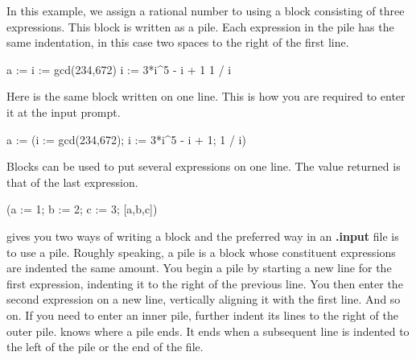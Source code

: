 {\begin{xtc}
\begin{xtccomment}
In this example, we assign a rational number to  using a block
consisting of three expressions.
This block is written as a pile.
Each expression in the pile has the same indentation, in this case two
spaces to the right of the first line.
\end{xtccomment}
\begin{spadsrc}
a :=
  i := gcd(234,672)
  i := 3*i^5 - i + 1
  1 / i
\end{spadsrc}
\begin{TeXOutput}
\begin{fricasmath}{1}
%
\end{fricasmath}
\end{TeXOutput}
\end{xtc}
\begin{xtc}
\begin{xtccomment}
Here is the same block written on one line.
This is how you are required to enter it at the input prompt.
\end{xtccomment}
\begin{spadsrc}
a := (i := gcd(234,672); i := 3*i^5 - i + 1; 1 / i)
\end{spadsrc}
\begin{TeXOutput}
\begin{fricasmath}{2}
%
\end{fricasmath}
\end{TeXOutput}
\end{xtc}
\begin{xtc}
\begin{xtccomment}
Blocks can be used to put several expressions on one line.
The value returned is that of the last expression.
\end{xtccomment}
\begin{spadsrc}
(a := 1; b := 2; c := 3; [a,b,c]) 
\end{spadsrc}
\begin{TeXOutput}
\begin{fricasmath}{3}
%
\end{fricasmath}
\end{TeXOutput}
\end{xtc}

\Language{} gives you two ways of writing a block and the
preferred way in an {\bf .input} file is to use a pile.
Roughly speaking, a pile is
a block whose constituent expressions are indented the same amount.
You begin a pile by starting a new line for the first expression,
indenting it to the right of the previous line.
You then enter the second expression on a new line, vertically aligning
it with the first line. And so on.
If you need to enter an inner pile, further indent its lines to the right
of the outer pile.
\Language{} knows where a pile ends.
It ends when a subsequent line is indented to the left of the pile or
the end of the file.

}
